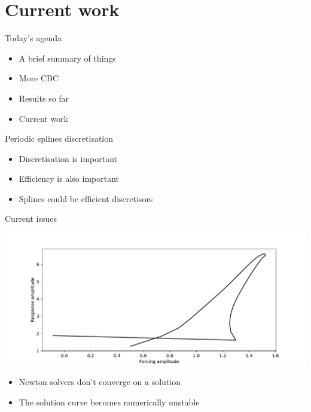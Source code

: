 \documentclass[presentation]{beamer}
\begin{document}
\section{Current work}
\label{sec:org7bdf570}
\begin{frame}[label={sec:org8de2435}]{Today's agenda}
\begin{itemize}
\item A brief summary of things
\end{itemize}
\vfill
\begin{itemize}
\item More CBC
\end{itemize}
\vfill
\begin{itemize}
\item Results so far
\end{itemize}
\vfill
\begin{itemize}
\item \alert{Current work}
\end{itemize}
\vfill
\end{frame}

\begin{frame}[label={sec:org1d1f4dd}]{Periodic splines discretisation}
\begin{itemize}
\item Discretisation is important
\end{itemize}
\vfill
\begin{itemize}
\item Efficiency is also important
\end{itemize}
\vfill
\begin{itemize}
\item Splines could be efficient discretisors
\end{itemize}
\end{frame}

\begin{frame}[label={sec:org1c4fe4d}]{Current issues}
\begin{center}
\includegraphics[width=.9\linewidth]{./5_knots_cbc.pdf}
\end{center}   

\begin{itemize}
\item Newton solvers don't converge on a solution

\item The solution curve becomes numerically unstable
\end{itemize}
\end{frame}
\end{document}

